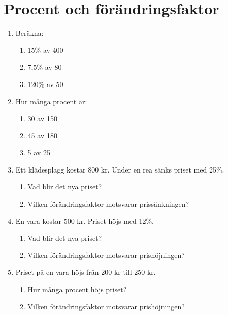 \documentclass[a4paper,11pt]{article}
\begin{document}
\newpage
\section*{Procent och förändringsfaktor}

\begin{enumerate}[label=\textbf{\arabic*.}]
    \item Beräkna:
    \begin{enumerate}[label=\alph*)]
        \item 15\% av 400
        \item 7,5\% av 80
        \item 120\% av 50
    \end{enumerate}
    
    \item Hur många procent är:
    \begin{enumerate}[label=\alph*)]
        \item 30 av 150
        \item 45 av 180
        \item 5 av 25
    \end{enumerate}
    
    \item Ett klädesplagg kostar 800 kr. Under en rea sänks priset med 25\%.
    \begin{enumerate}[label=\alph*)]
        \item Vad blir det nya priset?
        \item Vilken förändringsfaktor motsvarar prissänkningen?
    \end{enumerate}
    
    \item En vara kostar 500 kr. Priset höjs med 12\%.
    \begin{enumerate}[label=\alph*)]
        \item Vad blir det nya priset?
        \item Vilken förändringsfaktor motsvarar prishöjningen?
    \end{enumerate}
    
    \item Priset på en vara höjs från 200 kr till 250 kr.
    \begin{enumerate}[label=\alph*)]
        \item Hur många procent höjs priset?
        \item Vilken förändringsfaktor motsvarar prishöjningen?
    \end{enumerate}
    

\end{enumerate}
\end{document}

